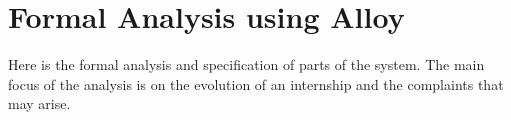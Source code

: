 \chapter{Formal Analysis using Alloy}%
\label{chap:Formal-Analysis-using-Alloy}%

\par Here is the formal analysis and specification of parts of the system. The main focus of the analysis is on the evolution of an internship and the complaints that may arise.

